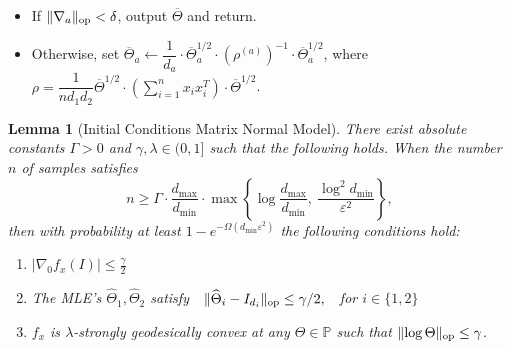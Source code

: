 \documentclass[aos]{imsart}
\newtheorem{lemma}[theorem]{Lemma}
\theoremstyle{definition}
\numberwithin{equation}{section}
\DeclareMathOperator{\op}{op}
\DeclarePairedDelimiter{\norm}{\lVert}{\rVert}
\newcommand{\otheta}{\overline{\Theta}}
\newcommand{\htheta}{\widehat{\Theta}}
\newcommand{\SPD}{\mathbb{P}}
\def\dmin{d_{\min}}
\def\dmax{d_{\max}}
\begin{document}
\begin{Algorithm}
\begin{enumerate}
\begin{itemize}
\vspace{5pt}

\item
If $\norm{\nabla_a}_{\op} < \delta$, output $\otheta$ and return.

\vspace{5pt}

\item Otherwise, set $\otheta_a \leftarrow \dfrac{1}{d_a} \cdot \otheta_a^{1/2} \cdot (\rho^{(a)})^{-1} \cdot \otheta_a^{1/2}$, where $\rho = \dfrac{1}{n d_1 d_2} \otheta^{1/2} \cdot \left( \sum_{i=1}^n x_i x_i^T \right) \cdot \otheta^{1/2}$.
\end{itemize}
\end{enumerate}
\caption{Matrix flip-flop algorithm}\label{alg:flip-flop matrix}
\end{Algorithm}

\begin{lemma}[Initial Conditions Matrix Normal Model]\label{lem:matrix-normal-initial-conditions}
There exist absolute constants $\Gamma > 0$ and $\gamma, \lambda \in (0,1]$ such that the following holds.
	When the number $n$ of samples satisfies
	$$n \geq \Gamma \cdot \dfrac{\dmax}{\dmin} \cdot \max\left\{ \log \dfrac{\dmax}{\dmin}, \ \dfrac{\log^2 \dmin}{\varepsilon^2}  \right\},$$
	then with probability at least $1 - e^{- \Omega(\dmin \varepsilon^2)}$ the following conditions hold:
	\begin{enumerate}
		\item $|\nabla_0 f_x(I)| \leq \frac{\gamma}{2}$
		\item The MLE's $\htheta_1, \htheta_2$ satisfy $\ \ \norm{\htheta_i - I_{d_i}}_{\op} \leq \gamma/2, \ \ $ for $i \in \{1,2\}$
		\item $f_x$ is $\lambda$-strongly geodesically convex at any $\Theta \in \SPD$ such that $\norm{\log \Theta}_{\op} \leq \gamma$.
	\end{enumerate}
\end{lemma}
\end{document}
